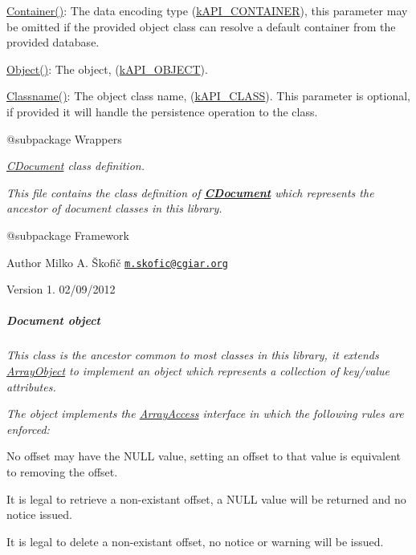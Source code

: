 \begin{DoxyItemize}
{\begin{DoxyItemize}
\item {\ttfamily \hyperlink{}{Container()}}\-: The data encoding type (\hyperlink{}{k\-A\-P\-I\-\_\-\-C\-O\-N\-T\-A\-I\-N\-E\-R}), this parameter may be omitted if the provided object class can resolve a default container from the provided database. 
\item {\ttfamily \hyperlink{}{Object()}}\-: The object, (\hyperlink{}{k\-A\-P\-I\-\_\-\-O\-B\-J\-E\-C\-T}). 
\item {\ttfamily \hyperlink{}{Classname()}}\-: The object class name, (\hyperlink{}{k\-A\-P\-I\-\_\-\-C\-L\-A\-S\-S}). This parameter is optional, if provided it will handle the persistence operation to the class. 
\end{DoxyItemize}}
\end{DoxyItemize}

{\itshape \begin{DoxyVerb} @subpackage        Wrappers\end{DoxyVerb}
}

{\itshape {\itshape \hyperlink{class_c_document}{C\-Document}} class definition.}

{\itshape This file contains the class definition of {\bfseries \hyperlink{class_c_document}{C\-Document}} which represents the ancestor of document classes in this library.}

{\itshape \begin{DoxyVerb} @subpackage        Framework
\end{DoxyVerb}
}

{\itshape \begin{DoxyAuthor}{Author}
Milko A. Škofič \href{mailto:m.skofic@cgiar.org}{\tt m.\-skofic@cgiar.\-org} 
\end{DoxyAuthor}
\begin{DoxyVersion}{Version}
1. 02/09/2012
\end{DoxyVersion}
\subparagraph*{Document object}}

{\itshape }

{\itshape This class is the ancestor common to most classes in this library, it extends \hyperlink{}{Array\-Object} to implement an object which represents a collection of key/value attributes.}

{\itshape The object implements the \hyperlink{}{Array\-Access} interface in which the following rules are enforced\-:}

{\itshape 
\begin{DoxyItemize}
\item No offset may have the {\ttfamily N\-U\-L\-L} value, setting an offset to that value is equivalent to removing the offset. 
\item It is legal to retrieve a non-\/existant offset, a {\ttfamily N\-U\-L\-L} value will be returned and no notice issued. 
\item It is legal to delete a non-\/existant offset, no notice or warning will be issued. 
\end{DoxyItemize}}


